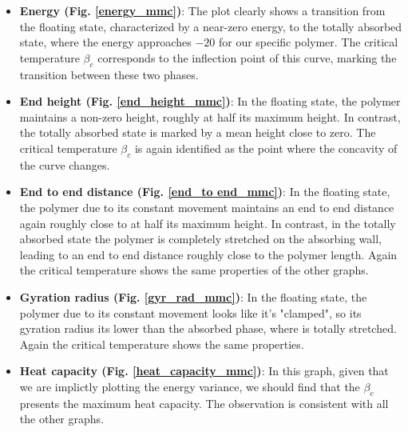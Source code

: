 \begin{itemize}
    \item \textbf{Energy (Fig. \ref{energy_mmc})}: The plot clearly shows a transition from the floating state, characterized by a 
    near-zero energy, to the totally absorbed state, where the energy approaches $-20$ for our specific polymer. 
    The critical temperature $\beta_c$ corresponds to the inflection point of this curve, marking the transition between these 
    two phases.
    
    \item \textbf{End height (Fig. \ref{end_height_mmc})}: In the floating state, the polymer maintains a non-zero height, roughly 
    at half its maximum height. In contrast, the totally absorbed state is marked by a mean height close to zero. The critical 
    temperature $\beta_c$ is again identified as the point where the concavity of the curve changes.

    \item \textbf{End to end distance (Fig. \ref{end_to end_mmc})}: In the floating state, the polymer due to its constant movement 
    maintains an end to end distance again roughly close to at half its maximum height. In contrast, in the totally absorbed state the polymer 
    is completely stretched on the absorbing wall, leading to an end to end distance roughly close to the polymer length. 
    Again the critical temperature shows the same properties of the other graphs.

    \item \textbf{Gyration radius (Fig. \ref{gyr_rad_mmc})}: In the floating state, the polymer due to its constant movement looks like it's
    "clamped", so its gyration radius its lower than the absorbed phase, where is totally stretched. 
    Again the critical temperature shows the same properties.

    \item \textbf{Heat capacity (Fig. \ref{heat_capacity_mmc})}: In this graph, given that we are implictly plotting the energy variance, we should find 
    that the $\beta_c$ presents the maximum heat capacity. The observation is consistent with all the other graphs.

\end{itemize}
